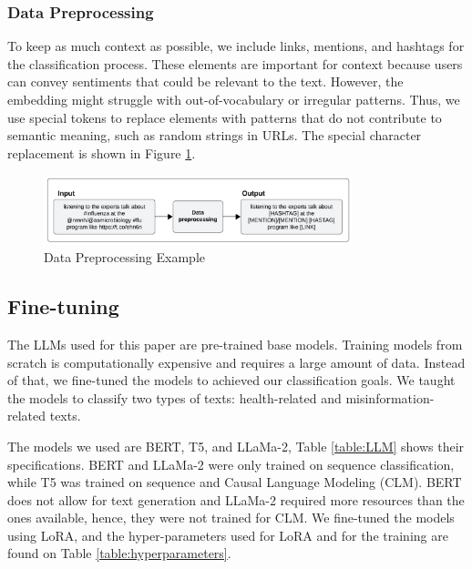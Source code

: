 \subsubsection{Data Preprocessing}
To keep as much context as possible, we include links, mentions, and hashtags for the classification process. These elements are important for context because users can convey sentiments that could be relevant to the text.
However, the embedding might struggle with out-of-vocabulary or irregular patterns. Thus, we use special tokens to replace elements with patterns that do not contribute
to semantic meaning, such as random strings in URLs. The special character replacement is shown in Figure \ref{fig:dpe}.

\begin{figure}[H]
	\begin{center}
		\includegraphics[width=0.8\textwidth]{figures/Data_preprocess_example.png}
	\end{center}
	\caption{Data Preprocessing Example}
	\label{fig:dpe}
\end{figure}

\vspace{-0.55em}
\subsection{Fine-tuning}
The LLMs used for this paper are pre-trained base models. Training models from scratch is computationally expensive and requires a large amount of data. Instead of that, we fine-tuned the models to achieved our classification goals. We taught the models to classify two types of texts: health-related and misinformation-related texts. 

The models we used  are BERT, T5, and LLaMa-2, Table \ref{table:LLM} shows their specifications. 
BERT and LLaMa-2 were only trained on sequence classification, while T5 was trained on sequence and Causal Language Modeling (CLM). BERT  does not allow for text generation and LLaMa-2 required more resources than the ones available, hence, they were not trained for CLM.  We fine-tuned the models using LoRA, and the hyper-parameters used for LoRA and for the training are found on Table \ref{table:hyperparameters}. 

